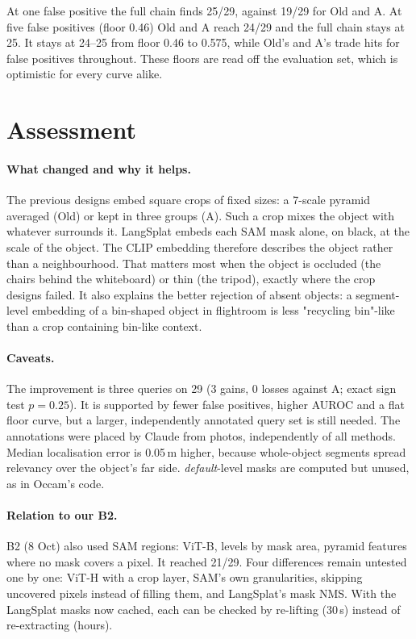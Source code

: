 \documentclass[11pt,a4paper]{article}
\begin{document}
\noindent At one false positive the full chain finds 25/29, against 19/29 for Old and A. At five false positives (floor
0.46) Old and A reach 24/29 and the full chain stays at 25. It stays at 24--25 from floor 0.46 to 0.575, while Old's
and A's trade hits for false positives throughout. These floors are read off the evaluation set, which is optimistic for
every curve alike.

\section{Assessment}
\paragraph{What changed and why it helps.} The previous designs embed square crops of fixed sizes: a 7-scale pyramid
averaged (Old) or kept in three groups (A). Such a crop mixes the object with whatever surrounds it. LangSplat embeds each
SAM mask alone, on black, at the scale of the object. The CLIP embedding therefore describes the object rather than a
neighbourhood. That matters most when the object is occluded (the chairs behind the whiteboard) or thin (the tripod),
exactly where the crop designs failed. It also explains the better rejection of absent objects: a segment-level
embedding of a bin-shaped object in flightroom is less "recycling bin"-like than a crop containing bin-like context.

\paragraph{Caveats.} The improvement is three queries on 29 (3 gains, 0 losses against A; exact sign test $p=0.25$).
It is supported by fewer false positives, higher AUROC and a flat floor curve, but a larger, independently annotated
query set is still needed. The annotations were placed by Claude from photos, independently of all methods. Median
localisation error is 0.05\,m higher, because whole-object segments spread relevancy over the object's far side.
\emph{default}-level masks are computed but unused, as in Occam's code.

\paragraph{Relation to our B2.} B2 (8 Oct) also used SAM regions: ViT-B, levels by mask area, pyramid features where no
mask covers a pixel. It reached 21/29. Four differences remain untested one by one: ViT-H with a crop layer, SAM's own
granularities, skipping uncovered pixels instead of filling them, and LangSplat's mask NMS. With the LangSplat masks now
cached, each can be checked by re-lifting (30\,s) instead of re-extracting (hours).
\end{document}
